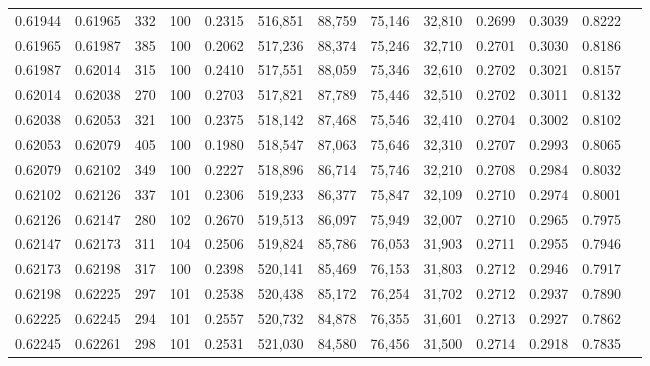 \begin{tabular}{rrrrrrrrrrrrr}
0.61944 & 0.61965 &   332 & 100 &                                     0.2315 & 516,851 &  88,759 &  75,146 &  32,810 & 0.2699 & 0.3039 & 0.8222 \\
0.61965 & 0.61987 &   385 & 100 &                                     0.2062 & 517,236 &  88,374 &  75,246 &  32,710 & 0.2701 & 0.3030 & 0.8186 \\
0.61987 & 0.62014 &   315 & 100 &                                     0.2410 & 517,551 &  88,059 &  75,346 &  32,610 & 0.2702 & 0.3021 & 0.8157 \\
0.62014 & 0.62038 &   270 & 100 &                                     0.2703 & 517,821 &  87,789 &  75,446 &  32,510 & 0.2702 & 0.3011 & 0.8132 \\
0.62038 & 0.62053 &   321 & 100 &                                     0.2375 & 518,142 &  87,468 &  75,546 &  32,410 & 0.2704 & 0.3002 & 0.8102 \\
0.62053 & 0.62079 &   405 & 100 &                                     0.1980 & 518,547 &  87,063 &  75,646 &  32,310 & 0.2707 & 0.2993 & 0.8065 \\
0.62079 & 0.62102 &   349 & 100 &                                     0.2227 & 518,896 &  86,714 &  75,746 &  32,210 & 0.2708 & 0.2984 & 0.8032 \\
0.62102 & 0.62126 &   337 & 101 &                                     0.2306 & 519,233 &  86,377 &  75,847 &  32,109 & 0.2710 & 0.2974 & 0.8001 \\
0.62126 & 0.62147 &   280 & 102 &                                     0.2670 & 519,513 &  86,097 &  75,949 &  32,007 & 0.2710 & 0.2965 & 0.7975 \\
0.62147 & 0.62173 &   311 & 104 &                                     0.2506 & 519,824 &  85,786 &  76,053 &  31,903 & 0.2711 & 0.2955 & 0.7946 \\
0.62173 & 0.62198 &   317 & 100 &                                     0.2398 & 520,141 &  85,469 &  76,153 &  31,803 & 0.2712 & 0.2946 & 0.7917 \\
0.62198 & 0.62225 &   297 & 101 &                                     0.2538 & 520,438 &  85,172 &  76,254 &  31,702 & 0.2712 & 0.2937 & 0.7890 \\
0.62225 & 0.62245 &   294 & 101 &                                     0.2557 & 520,732 &  84,878 &  76,355 &  31,601 & 0.2713 & 0.2927 & 0.7862 \\
0.62245 & 0.62261 &   298 & 101 &                                     0.2531 & 521,030 &  84,580 &  76,456 &  31,500 & 0.2714 & 0.2918 & 0.7835 \\

\end{tabular}

